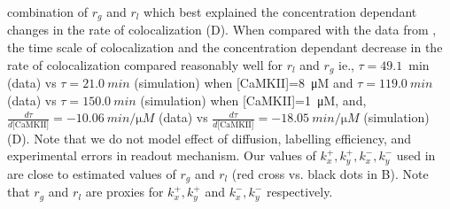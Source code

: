 \documentclass[9pt,lineno,doublespacing]{elife}
\begin{document}
combination of $r_g$ and $r_l$ which best explained the concentration dependant
changes in the rate of colocalization (D). When
compared with the data from \cite{stratton_activation-triggered_2014}, the time
scale of colocalization and the concentration dependant decrease in the rate of
colocalization compared reasonably well for $r_l$ and $r_g$ ie.,
$\tau=\SI{49.1}{\min}$ (data) vs $\tau=\SI{21.0}{min}$ (simulation) when
[CaMKII]=\SI{8}{\micro M} and $\tau=\SI{119.0}{min}$ (data) vs
$\tau=\SI{150.0}{min}$ (simulation) when [CaMKII]=\SI{1}{\micro M}, and,
$\frac{d\tau}{d\text{[CaMKII]}}=\SI{-10.06}{min\per\micro M}$ (data) vs
$\frac{d\tau}{d\text{[CaMKII]}}=\SI{-18.05}{min\per\micro M}$ (simulation)
(D). Note that we do not model effect of
diffusion, labelling efficiency, and experimental errors in readout mechanism.
Our values of $k_x^+, k_y^+, k_x^-, k_y^-$ used in  are close to
estimated values of $r_g$ and $r_l$ (red cross vs. black dots in
B). Note that $r_g$ and $r_l$ are proxies for
$k_x^+,k_y^+$ and $k_x^-, k_y^-$ respectively.
\end{document}
